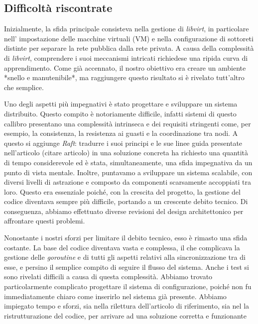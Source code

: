 \subsection{Difficoltà riscontrate}
Inizialmente, la sfida principale consisteva nella gestione di \textit{libvirt}, in particolare nell'
impostazione delle macchine virtuali (VM) e nella configurazione di sottoreti distinte per separare la rete 
pubblica dalla rete privata. A causa della complessità di \textit{libvirt}, comprendere i suoi meccanismi 
intricati richiedese una ripida curva di apprendimento. Come già accennato, il nostro obiettivo era creare un 
ambiente *snello e manutenibile*, ma raggiungere questo risultato si è rivelato tutt'altro che semplice.

Uno degli aspetti più impegnativi è stato progettare e sviluppare un sistema distribuito. Questo compito è 
notoriamente difficile, infatti sistemi di questo callibro presentano una complessità 
intrinseca e dei requisiti stringenti come, per esempio, la consistenza, la resistenza ai guasti e la 
coordinazione tra nodi. A questo si aggiunge \textit{Raft}:
tradurre i suoi principi e le sue linee guida presentate nell'articolo (citare articolo) in una soluzione 
concreta ha richiesto una quantità di tempo considerevole ed è stata, simultaneamente, una sfida impegnativa da 
un punto di vista mentale.
Inoltre, puntavamo a sviluppare un sistema scalabile, con diversi livelli di astrazione e composto da 
componenti scarsamente accoppiati tra loro. Questo era essenziale poiché, 
con la crescita del progetto, la gestione del codice diventava sempre più difficile, portando a un crescente 
debito tecnico. Di conseguenza, abbiamo effettuato diverse revisioni del design architettonico per affrontare 
questi problemi.

Nonostante i nostri sforzi per limitare il debito tecnico, esso è rimasto una sfida costante. La base del codice 
diventava vasta e complessa, il che complicava la gestione delle \textit{goroutine} e di tutti gli aspetti 
relativi alla sincronizzazione tra di esse, e persino il semplice compito di seguire il flusso del sistema. 
Anche i test si sono rivelati difficili a causa di questa complessità. Abbiamo trovato particolarmente 
complicato progettare il sistema di configurazione, poiché non fu immediatamente chiaro come inserirlo nel 
sistema già presente. Abbiamo impiegato tempo e sforzi, sia nella rilettura dell'articolo di riferimento, sia nel
la ristrutturazione del codice, per arrivare ad una soluzione corretta e funzionante

